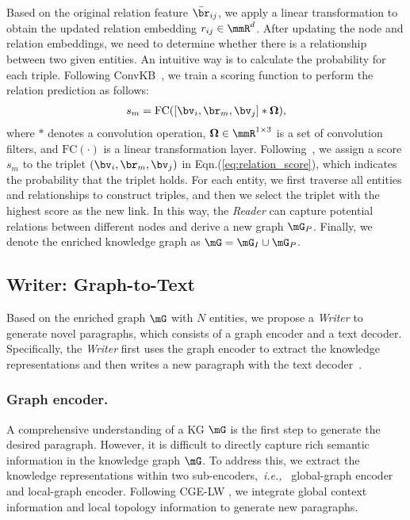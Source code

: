 \documentclass[letterpaper]{article}
\def\ie{\emph{i.e., }}
\begin{document}
Based on the original relation feature 
$\bar{\br}_{ij}$, 
we apply a linear transformation to obtain the updated relation embedding $r_{ij} \in \mmR^{d}$.
After updating the node and relation embeddings, we need to 
determine whether there is a relationship between two given entities. An intuitive way is to calculate the probability for each triple. Following ConvKB~\cite{Nguyen2018ANE}, we train a scoring function to perform the relation prediction as follows:
\begin{equation}
    \begin{aligned}
    \label{eq:relation_score}
    s_m = \mathrm{FC}([\bv_i, \br_m, \bv_j] * \mathbf{\Omega}) ,
    \end{aligned}
\end{equation}
where $*$ denotes a convolution operation, {$\mathbf{\Omega} \in \mmR^{1 \times 3}$} is a set of convolution filters, and $\mathrm{FC}(\cdot)$ is a linear transformation layer. Following~\cite{Nathani2019LearningAE}, we assign a score $s_m$ to the triplet $(\bv_i, \br_m, \bv_j)$ in Eqn.(\ref{eq:relation_score}), which indicates the probability that the triplet holds. 
For each entity, we first traverse all entities and relationships to construct triples, and then we select the triplet with the highest score as the new link.
In this way, the \textit{Reader} can capture potential relations between different nodes and derive a new graph $\mG_{P}$.
Finally, we denote the enriched knowledge graph as $\mG= \mG_{I} \cup \mG_{P}$.



\subsection{Writer: Graph-to-Text}
Based on the enriched graph $\mG$ with $N$ entities, we propose a \textit{Writer} to generate novel paragraphs, 
which consists of a graph encoder and a text decoder.
Specifically, the \textit{Writer} first uses the graph encoder to extract the knowledge representations and then writes a new paragraph with the text decoder~\cite{Vaswani2017AttentionIA}.
\subsubsection{Graph encoder.}
A comprehensive understanding of a KG $\mG$ is the first step to generate the desired paragraph. However, it is difficult to directly capture rich semantic information in the knowledge graph $\mG$. 
To address this,
we extract the knowledge representations within two sub-encoders,~\ie~global-graph encoder and local-graph encoder.
Following CGE-LW \cite{ribeiro2020modeling}, we integrate global context information and local topology information to generate new paragraphs.
\end{document}
